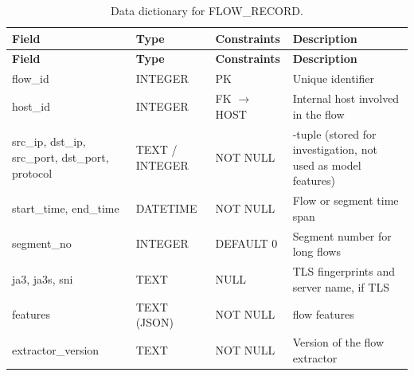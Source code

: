 {\small
\begin{longtable}{|>{\raggedright\arraybackslash}p{}|>{\raggedright\arraybackslash}p{}|>{\raggedright\arraybackslash}p{}|>{\raggedright\arraybackslash}p{}|}
\caption{Data dictionary for FLOW\_RECORD.}\label{tab:4.19}\\
\hline
\textbf{Field} & \textbf{Type} & \textbf{Constraints} & \textbf{Description} \\ \hline
\endfirsthead
\hline
\textbf{Field} & \textbf{Type} & \textbf{Constraints} & \textbf{Description} \\ \hline
\endhead
flow\_id & INTEGER & PK & Unique identifier \\ \hline
host\_id & INTEGER & FK $\rightarrow$ HOST & Internal host involved in the flow \\ \hline
src\_ip, dst\_ip, src\_port, dst\_port, protocol & TEXT / INTEGER & NOT NULL & 5-tuple (stored for investigation, not used as model features) \\ \hline
start\_time, end\_time & DATETIME & NOT NULL & Flow or segment time span \\ \hline
segment\_no & INTEGER & DEFAULT 0 & Segment number for long flows \\ \hline
ja3, ja3s, sni & TEXT & NULL & TLS fingerprints and server name, if TLS \\ \hline
features & TEXT (JSON) & NOT NULL & 78 flow features \\ \hline
extractor\_version & TEXT & NOT NULL & Version of the flow extractor \\ \hline
\end{longtable}
}

